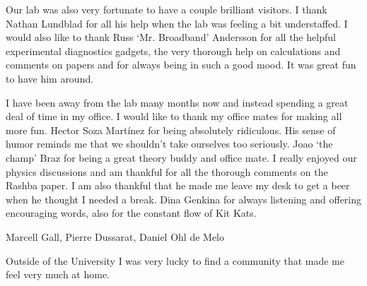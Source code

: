 Our lab was also very fortunate to have a couple brilliant visitors. I thank Nathan Lundblad for all his help when the lab was feeling a bit understaffed. I would also like to thank Russ `Mr. Broadband' Andersson for all the helpful experimental diagnostics gadgets, the very thorough help on calculations and comments on papers and for always being in such a good mood. It was great fun to have him around. 

I have been away from the lab many months now and instead spending a great deal of time in my office. I would like to thank my office mates for making all more fun. Hector Soza Mart\'inez for being absolutely ridiculous. His sense of humor reminds me that we shouldn't take ourselves too seriously. Joao `the champ' Braz for being a great theory buddy and office mate. I really enjoyed our physics discussions and am thankful for all the thorough comments on the Rashba paper. I am also thankful that he made me leave my desk to get a beer when he thought I needed a break. Dina Genkina for always listening and offering encouraging words, also for the constant flow of Kit Kats. 

Marcell Gall, Pierre Dussarat, Daniel Ohl de Melo 

Outside of the University I was very lucky to find a community that made me feel very much at home. 






